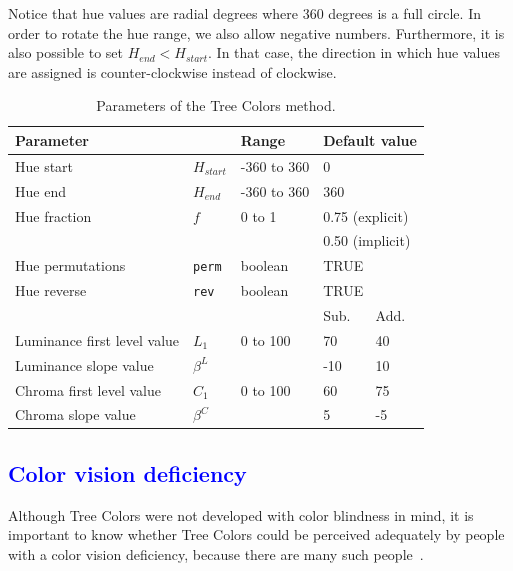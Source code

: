 \documentclass[review,journal]{vgtc}         %
\newcommand{\changedM}[1]{\textcolor{blue}{#1}}
\begin{document}
Notice that hue values are radial degrees where 360 degrees is a full circle. In order to rotate the hue range, we also allow negative numbers. Furthermore, it is also possible to set $H_{end} < H_{start}$. In that case, the direction in which hue values are assigned is counter-clockwise instead of clockwise.

\begin{table}[!htb]
\begin{footnotesize}
\begin{center}
\begin{tabular}{lllll}
\toprule
\multicolumn{2}{l}{Parameter    } & Range & \multicolumn{2}{l}{Default value} \\
\midrule
Hue start 				& $H_{start}$ &-360 to 360  & \multicolumn{2}{l}{0}      \\
Hue end   				& $H_{end}$ & -360 to 360 & \multicolumn{2}{l}{360}       \\
Hue fraction 				& $f$	& 0 to 1 & \multicolumn{2}{l}{0.75 (explicit)} \\
					&	&	 & \multicolumn{2}{l}{0.50 (implicit)} \\
Hue permutations 			& \texttt{perm} & boolean & \multicolumn{2}{l}{TRUE}      \\
Hue reverse   			& \texttt{rev} & boolean  & \multicolumn{2}{l}{TRUE}    \\
\cmidrule(r){4-5}
					&		&		& Sub. & Add. \\
\cmidrule(r){4-5}
Luminance first level value 	& $L_1$	& 0 to 100  & 70 & 40      \\
Luminance slope value 		& $\beta^L$ &       & -10  & 10      \\
Chroma first level value 		& $C_1$ &  0 to 100  & 60   & 75    \\
Chroma slope value 		& $\beta^C$ &     & 5   & -5    \\
\bottomrule
\end{tabular}
\end{center}
\end{footnotesize}
\caption{Parameters of the Tree Colors method.}\label{table:param}
\end{table}

\subsection{\changedM{Color vision deficiency}}
Although Tree Colors were not developed with color blindness in mind, it is important to know whether Tree Colors could be perceived adequately by people with a color vision deficiency, because there are many such people~\cite{birch12}.
\end{document}

